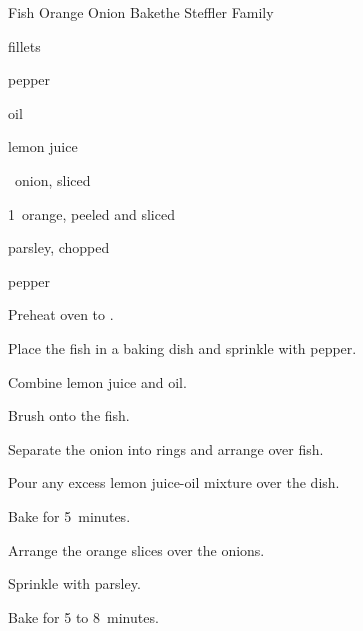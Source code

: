 \begin{recipe}{Fish Orange Onion Bake}{the Steffler Family}{}

\begin{ingredients}
\item \lbs{\half}  fillets
\item \tp{\quarter} pepper
\item {} oil
\item {} lemon juice
\item \half{}~onion, sliced
\item 1~orange, peeled and sliced
\item {} parsley, chopped
\item pepper
\end{ingredients}

\begin{directions}
\item Preheat oven to .
\item Place the fish in a baking dish and sprinkle with pepper.
\item Combine lemon juice and oil.
\item Brush onto the fish.
\item Separate the onion into rings and arrange over fish.
\item Pour any excess lemon juice-oil mixture over the dish.
\item Bake for 5~minutes.
\item Arrange the orange slices over the onions.
\item Sprinkle with parsley.
\item Bake for 5 to 8~minutes.
\end{directions}
\end{recipe}
